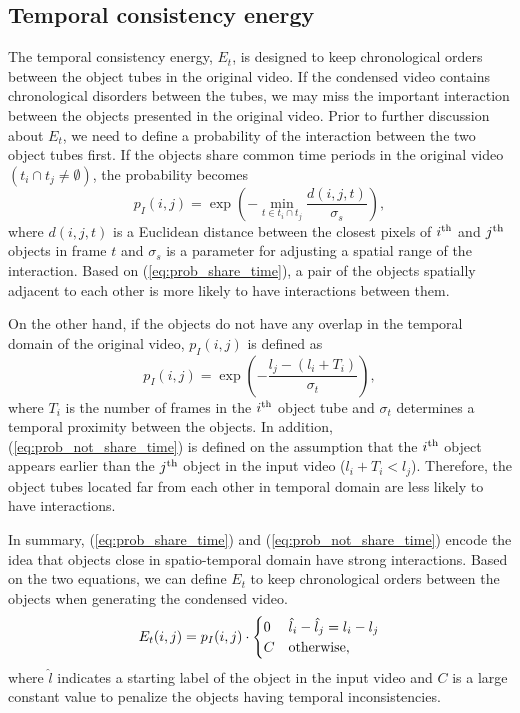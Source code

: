 \documentclass[11pt]{hyu_thesis}
\begin{document}
\subsection{Temporal consistency energy}
The temporal consistency energy, $E_t$, is designed to keep chronological orders between the object tubes in the original video. If the condensed video contains chronological disorders between the tubes, we may miss the important interaction between the objects presented in the original video. Prior to further discussion about $E_t$, we need to define a probability of the interaction between the two object tubes first. If the objects share common time periods in the original video $(t_i \cap t_j \neq \emptyset)$, the probability becomes
\begin{equation}
\label{eq:prob_share_time}
p_I(i, j) = 
\exp\left(-\min_{t \in t_i \cap t_j} \frac{d(i,j,t)}{\sigma_s}\right),
\end{equation}
where $d(i,j,t)$ is a Euclidean distance between the closest pixels of $i^{\rm{th}}$ and $j^{\rm{th}}$ objects in frame $t$ and $\sigma_s$ is a parameter for adjusting a spatial range of the interaction. Based on (\ref{eq:prob_share_time}), a pair of the objects spatially adjacent to each other is more likely to have interactions between them.

On the other hand, if the objects do not have any overlap in the temporal domain of the original video, $p_I(i,j)$ is defined as
\begin{equation}
\label{eq:prob_not_share_time}
p_I(i,j)=\exp\left(-\frac{l_j - (l_i + T_i)}{\sigma_t}\right),
\end{equation}
where $T_i$ is the number of frames in the $i^{\rm{th}}$ object tube and $\sigma_t$ determines a temporal proximity between the objects. In addition, (\ref{eq:prob_not_share_time}) is defined on the assumption that the $i^{\rm{th}}$ object appears earlier than the $j^{\rm{th}}$ object in the input video ($l_i + T_i < l_j$). Therefore, the object tubes located far from each other in temporal domain are less likely to have interactions.

In summary, (\ref{eq:prob_share_time}) and (\ref{eq:prob_not_share_time}) encode the idea that objects close in spatio-temporal domain have strong interactions. Based on the two equations, we can define $E_t$ to keep chronological orders between the objects when generating the condensed video.
\begin{equation}
\label{eq:Et}
E_t(i,j)=
p_I(i, j) \cdot
\begin{cases}
0 & \hat{l}_i - \hat{l}_j = l_i - l_j \\
C & \rm{otherwise},
\end{cases}
\end{equation}
where $\hat{l}$ indicates a starting label of the object in the input video and $C$ is a large constant value to penalize the objects having temporal inconsistencies. 
\end{document}
